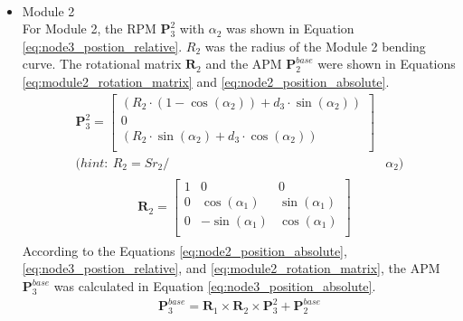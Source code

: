 \begin{itemize}
\begin{align}
        \label{eq:node2_position_absolute}
    \end{align}
    \vspace{-15mm}
    \item Module 2 \\
    For Module 2, the RPM $\textbf{P}_{3}^{2}$ 
    with $\alpha_2$ was shown in Equation \ref{eq:node3_postion_relative}. $R_2$ was the radius of the Module 2 bending 
    curve. The rotational matrix $\textbf{R}_{2}$ and the APM $\textbf{P}_{2}^{base}$ were shown 
    in Equations \ref*{eq:module2_rotation_matrix} and \ref{eq:node2_position_absolute}.
    \begin{align}
        \textbf{P}_{3}^{2} = 
        \begin{bmatrix}
            (R_2\cdot(1-\cos(\alpha_2)) + d_3\cdot \sin(\alpha_2)) \\
            0 \\
            (R_2\cdot \sin(\alpha_2) + d_3\cdot \cos(\alpha_2)) \\
        \end{bmatrix}&
        \label{eq:node3_postion_relative} \\
        \nonumber (hint: \ R_2 = {Sr}_2/ &\alpha_2)
    \end{align}
    \vspace{-15mm}
    \begin{align}
        &\begin{aligned}
            \textbf{R}_{2} = 
            \begin{bmatrix}
                1 & 0 & 0 \\
                0 & \cos(\alpha_1) & \sin(\alpha_1) \\
                0 & -\sin(\alpha_1) & \cos(\alpha_1) \\
            \end{bmatrix}
        \end{aligned}
        \label{eq:module2_rotation_matrix}
    \end{align}
    According to the Equations \ref{eq:node2_position_absolute}, \ref{eq:node3_postion_relative}, and 
    \ref*{eq:module2_rotation_matrix}, the APM $\textbf{P}_{3}^{base}$ was calculated in Equation \ref{eq:node3_position_absolute}.
    \vspace{-5mm}
    \begin{align}
        \textbf{P}_{3}^{base} = \textbf{R}_{1} \times \textbf{R}_{2} 
        \times \textbf{P}_{3}^{2} + \textbf{P}_{2}^{base}
        \label{eq:node3_position_absolute}
    \end{align}

\end{itemize}
